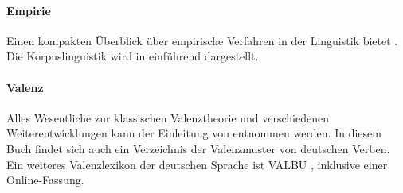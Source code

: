 {\begin{sloppypar}
\paragraph*{Empirie}

Einen kompakten Überblick über empirische Verfahren in der Linguistik bietet \citet{Albert2007}.
Die Korpuslinguistik wird in \citet{PerkuhnEa2012} einführend dargestellt.

\paragraph*{Valenz}

Alles Wesentliche zur klassischen Valenztheorie und verschiedenen Weiterentwicklungen kann der Einleitung von \citet{HelbigSchenkel1991} entnommen werden.
In diesem Buch findet sich auch ein Verzeichnis der Valenzmuster von deutschen Verben.
Ein weiteres Valenzlexikon der deutschen Sprache ist VALBU \citep{SchumacherEa2004}, inklusive einer Online-Fassung.

\end{sloppypar}

}
